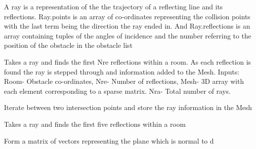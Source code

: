 \documentclass[letterpaper,10pt,english]{sphinxmanual}
\begin{document}
\begin{fulllineitems}
\label{index:Rays.Ray}
A ray is a representation of the the trajectory of a reflecting line
and its reflections. Ray.points is an array of co-ordinates representing
the collision points with the last term being the direction the ray ended in.
And Ray.reflections is an array containing tuples of the angles of incidence
and the number referring to the position of the obstacle in the obstacle list

\begin{fulllineitems}
\label{index:Rays.Ray.mesh_multiref}
Takes a ray and finds the first Nre reflections within a room.
As each reflection is found the ray is stepped through and
information added to the Mesh.
Inputs: Room- Obstacle co-ordinates, Nre- Number of reflections,
Mesh- 3D array with each element corresponding to a sparse matrix.
Nra- Total number of rays.

\end{fulllineitems}


\begin{fulllineitems}
\label{index:Rays.Ray.mesh_singleray}
Iterate between two intersection points and store the ray information in the Mesh

\end{fulllineitems}


\begin{fulllineitems}
\label{index:Rays.Ray.multiref}
Takes a ray and finds the first five reflections within a room

\end{fulllineitems}


\begin{fulllineitems}
\label{index:Rays.Ray.normal_mat}
Form a matrix of vectors representing the plane which is normal to d


\end{fulllineitems}
\end{fulllineitems}
\end{document}
